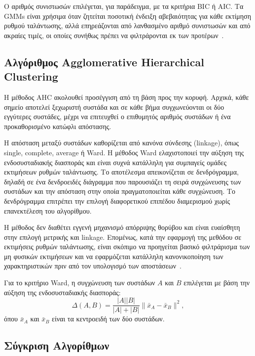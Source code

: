 Ο αριθμός συνιστωσών επιλέγεται, για παράδειγμα, με τα κριτήρια BIC ή AIC. Τα GMMs είναι χρήσιμα όταν ζητείται ποσοτική ένδειξη αβεβαιότητας για κάθε εκτίμηση ρυθμού ταλάντωσης, αλλά επηρεάζονται από λανθασμένο αριθμό συνιστωσών και από ακραίες τιμές, οι οποίες συνήθως πρέπει να φιλτράρονται εκ των προτέρων~\cite{gmm2002,dempster1977em,mclachlan2004finite}.

\subsection{Αλγόριθμος Agglomerative Hierarchical Clustering}

Η μέθοδος AHC ακολουθεί προσέγγιση από τη βάση προς την κορυφή. Αρχικά, κάθε σημείο αποτελεί ξεχωριστή συστάδα και σε κάθε βήμα συγχωνεύονται οι δύο εγγύτερες συστάδες, μέχρι να επιτευχθεί ο επιθυμητός αριθμός συστάδων ή ένα προκαθορισμένο κατώφλι απόστασης.

Η απόσταση μεταξύ συστάδων καθορίζεται από κανόνα σύνδεσης (linkage), όπως single, complete, average ή Ward. Η μέθοδος Ward ελαχιστοποιεί την αύξηση της ενδοσυσταδιακής διασποράς και είναι συχνά κατάλληλη για συμπαγείς ομάδες εκτιμήσεων ρυθμών ταλάντωσης. Το αποτέλεσμα απεικονίζεται σε δενδρόγραμμα, δηλαδή σε ένα δενδροειδές διάγραμμα που παρουσιάζει τη σειρά συγχώνευσης των συστάδων και την απόσταση στην οποία πραγματοποιείται κάθε συγχώνευση. Το δενδρόγραμμα επιτρέπει την επιλογή διαφορετικού επιπέδου διαμερισμού χωρίς επανεκτέλεση του αλγορίθμου.

Η μέθοδος δεν διαθέτει εγγενή μηχανισμό απόρριψης θορύβου και είναι ευαίσθητη στην επιλογή μετρικής και linkage. Επομένως, κατά την εφαρμογή της μεθόδου σε εκτιμήσεις ρυθμών ταλάντωσης, είναι σκόπιμο να προηγείται βασικό φιλτράρισμα των μη φυσικών εκτιμήσεων και να εφαρμόζεται κατάλληλη κανονικοποίηση των χαρακτηριστικών πριν από τον υπολογισμό των αποστάσεων~\cite{agglomerative1963,1lance1967}.

Για το κριτήριο Ward, η συγχώνευση των συστάδων $A$ και $B$ επιλέγεται με βάση την αύξηση της ενδοσυσταδιακής διασποράς:
\begin{equation}
\Delta(A,B)=\frac{|A||B|}{|A|+|B|}\lVert\bar{x}_A-\bar{x}_B\rVert^2,
\label{eq:ward-linkage}
\end{equation}
όπου $\bar{x}_A$ και $\bar{x}_B$ είναι τα κεντροειδή των δύο συστάδων.


\subsection{Σύγκριση Αλγορίθμων}

